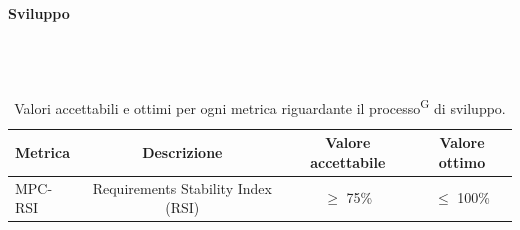 \documentclass[8pt]{article}
\newcommand{\glossterm}[1]{#1\textsuperscript{G}} %
\newcommand{\subsubsubsection}[1]{\paragraph{#1}\mbox{}\\\\}
\begin{document}
\clearpage
\subsubsubsection{Sviluppo}
\begin{table}[h]	
	\centering
	\begin{tabular}{lccc}
		\toprule
		\textbf{Metrica}& \textbf{Descrizione} & \textbf{Valore accettabile} & \textbf{Valore ottimo} \\
		\midrule
		MPC-RSI & Requirements Stability Index (RSI) & $\geq $ 75\%  & $\leq$ 100\% \\
		\bottomrule
	\end{tabular}
	\caption{Valori accettabili e ottimi per ogni metrica riguardante il \glossterm{processo} di sviluppo.}
	\label{table:Valori accettabili e ottimi per ogni metrica riguardante il processo di sviluppo.}
\end{table}
\end{document}
